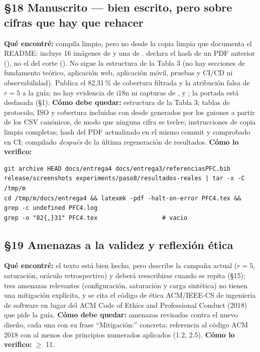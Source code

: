 \subsection*{\S18 Manuscrito --- bien escrito, pero sobre cifras que hay que rehacer}
\textbf{Qu\'e encontr\'e:} compila limpio, pero no desde la copia limpia que documenta el README: incluye 16 im\'agenes de  y una de .  declara el hash de un PDF anterior (), no el del corte (). No sigue la estructura de la Tabla 3 (no hay secciones de fundamento te\'orico, aplicaci\'on web, aplicaci\'on m\'ovil, pruebas y CI/CD ni observabilidad). Publica el 82,31\,\% de cobertura filtrada y la atribuci\'on falsa de $r=5$ a la gu\'ia; no hay evidencia de i18n ni capturas de ,  y ; la portada est\'a desfasada (\S1). \textbf{C\'omo debe quedar:} estructura de la Tabla 3; tablas de protocolo, ISO y cobertura incluidas con  desde  generados por los guiones a partir de los CSV can\'onicos, de modo que ninguna cifra se teclee; instrucciones de copia limpia completas; hash del PDF actualizado en el mismo commit y comprobado en CI; compilado \emph{despu\'es} de la \'ultima regeneraci\'on de resultados. \textbf{C\'omo lo verifico:}\begin{verbatim}
git archive HEAD docs/entrega4 docs/entrega3/referenciasPFC.bib release/screenshots experiments/paso8/resultados-reales | tar -x -C /tmp/m
cd /tmp/m/docs/entrega4 && latexmk -pdf -halt-on-error PFC4.tex && grep -c undefined PFC4.log
grep -o "82{,}31" PFC4.tex                  # vacio
\end{verbatim}

\subsection*{\S19 Amenazas a la validez y reflexi\'on \'etica}
\textbf{Qu\'e encontr\'e:} el texto est\'a bien hecho, pero describe la campa\~na actual ($r=5$, saturaci\'on, or\'aculo retrospectivo) y deber\'a reescribirse cuando se repita (\S15); tres amenazas relevantes (configuraci\'on, saturaci\'on y carga sint\'etica) no tienen una mitigaci\'on expl\'icita, y se cita el c\'odigo de \'etica ACM/IEEE-CS de ingenier\'ia de software en lugar del ACM Code of Ethics and Professional Conduct (2018) que pide la gu\'ia. \textbf{C\'omo debe quedar:} amenazas revisadas contra el nuevo dise\~no, cada una con su frase ``Mitigaci\'on:'' concreta; referencia al c\'odigo ACM 2018 con al menos dos principios numerados aplicados (1.2, 2.5). \textbf{C\'omo lo verifico:}  $\ge$ 11.

